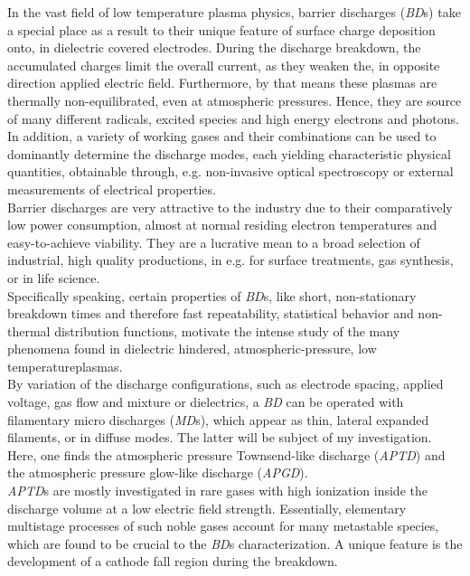 \documentclass[a4paper,10pt]{article}
\newcommand{\tilt}[1]{\textit{#1}}
\begin{document}
		In the vast field of low temperature plasma physics, barrier discharges (\tilt{BD}s) take a special place as a result to their unique feature of surface charge deposition onto, in dielectric covered electrodes. During the discharge breakdown, the accumulated charges limit the overall current, as they weaken the, in opposite direction applied electric field. Furthermore, by that means these plasmas are thermally non-equilibrated, even at atmospheric pressures. Hence, they are source of many different radicals, excited species and high energy electrons and photons. In addition, a variety of working gases and their combinations can be used to dominantly determine the discharge modes, each yielding characteristic physical quantities, obtainable through, e.g. non-invasive optical spectroscopy or external measurements of electrical properties.\\ 
		Barrier discharges are very attractive to the industry due to their comparatively low power consumption, almost at normal residing electron temperatures and easy-to-achieve viability. They are a lucrative mean to a broad selection of industrial, high quality productions, in e.g. for surface treatments, gas synthesis, or in life science.\\
		Specifically speaking, certain properties of \tilt{BD}s, like short, non-stationary breakdown times and therefore fast repeatability, statistical behavior and non-thermal distribution functions, motivate the intense study of the many phenomena found in dielectric hindered, atmospheric-pressure, low temperature\linebreak plasmas.\\
		By variation of the discharge configurations, such as electrode spacing, applied voltage, gas flow and mixture or dielectrics, a \tilt{BD} can be operated with filamentary micro discharges (\tilt{MD}s), which appear as thin, lateral expanded filaments, or in diffuse modes. The latter will be subject of my investigation. Here, one finds the atmospheric pressure Townsend-like discharge (\tilt{APTD}) and the atmospheric pressure glow-like discharge (\tilt{APGD}).\\
		\tilt{APTD}s are mostly investigated in rare gases with high ionization inside the discharge volume at a low electric field strength. Essentially, elementary multistage processes of such noble gases account for many metastable species, which are found to be crucial to the \tilt{BD}s characterization. A unique feature is the development of a cathode fall region during the breakdown.\\
\end{document}
